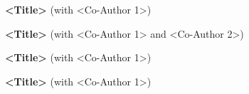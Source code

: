 \begin{cventries}
   \cventry
   {\textbf{\color{darkgray} }}
   {}
   {}
   {}
   {
   	\begin{cvitems}
  		\item
  		{\textbf{<Title>} (with <Co-Author 1>)}
  		\vspace{.1cm}
  		\item
  		{\textbf{<Title>}  (with <Co-Author 1> and <Co-Author 2>)}
  	\end{cvitems}  
    }
    \cventry
    {\textbf{\color{darkgray} }}
    {}
    {}
    {}
    {
      \begin{cvitems}
      	\item
      	{\textbf{<Title>} (with <Co-Author 1>)}
      	\vspace{.1cm}
      	\item
      	{\textbf{<Title>} (with <Co-Author 1>)}
      \end{cvitems}    
    }
    \vspace{-0.2cm}
\end{cventries}

